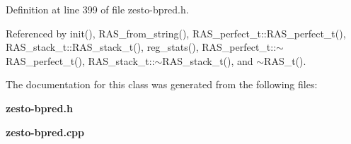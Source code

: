 Definition at line 399 of file zesto-bpred.h.

Referenced by init(), RAS\_\-from\_\-string(), RAS\_\-perfect\_\-t::RAS\_\-perfect\_\-t(), RAS\_\-stack\_\-t::RAS\_\-stack\_\-t(), reg\_\-stats(), RAS\_\-perfect\_\-t::$\sim$RAS\_\-perfect\_\-t(), RAS\_\-stack\_\-t::$\sim$RAS\_\-stack\_\-t(), and $\sim$RAS\_\-t().

The documentation for this class was generated from the following files:\begin{CompactItemize}
\item 
{\bf zesto-bpred.h}\item 
{\bf zesto-bpred.cpp}\end{CompactItemize}
